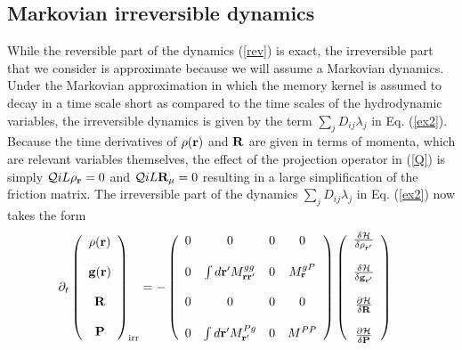 \documentclass[b5paper,openright,11pt]{book}
\begin{document}
\subsection{Markovian irreversible dynamics}
While the  reversible part of  the dynamics (\ref{rev}) is  exact, the
irreversible  part  that we  consider  is  approximate
because  we will  assume a  Markovian dynamics.   Under the  Markovian
approximation in which the memory kernel is assumed to decay in a time
scale  short  as compared  to  the  time  scales of  the  hydrodynamic
variables,   the  irreversible   dynamics   is  given   by  the   term
$\sum_jD_{ij}\lambda_j$   in  Eq.   (\ref{ex2}).   Because   the  time
derivatives of  $\rho({\bf r})$ and  ${\bf R}$  are given in  terms of
momenta, which  are relevant variables  themselves, the effect  of the
projection operator in (\ref{Q}) is simply ${\cal Q} iL\rho_{\bf r}=0$
and ${\cal Q}  iL{\bf R}_{\mu}=0$ resulting in  a large simplification
of  the  friction  matrix.   The irreversible  part  of  the  dynamics
$\sum_jD_{ij}\lambda_j$ in Eq. (\ref{ex2}) now takes the form
\begin{align}
\partial_t  \left(
    \begin{array}{c}
\rho({\bf r})\\
\\
{\bf g}({\bf r})\\
\\
{\bf R}\\
\\
{\bf P}
    \end{array}
\right)_{\rm irr}
&=
-\left(\begin{array}{cccc}
  0&0 &0&0\\
\\
0 &\int d{\bf r}'M^{gg}_{{\bf r}{\bf r}'}&0&M^{gP}_{\bf r}\\
\\
  0&0 &0&0\\
\\
0&\int d{\bf r}' M^{Pg}_{{\bf r}'}&0&M^{PP}
\end{array}\right)
\left(    \begin{array}{c}
\frac{\delta {\cal H}}{\delta \rho_{{\bf r}'}}\\
\\
\frac{\delta {\cal H}}{\delta {\bf g}_{{\bf r}'}}\\
\\
\frac{\partial {\cal H}}{\delta {\bf R}}\\
\\
\frac{\partial {\cal H}}{\delta {\bf P}}
    \end{array}
\right)
\label{irr1}
\end{align}
\end{document}
